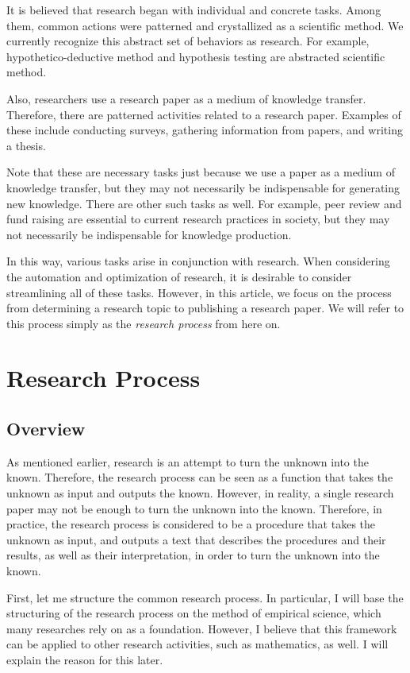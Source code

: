 \documentclass{book}
\begin{document}
It is believed that research began with individual and concrete tasks. Among them, common actions were patterned and crystallized as a scientific method. We currently recognize this abstract set of behaviors as research. For example, hypothetico-deductive method and hypothesis testing are abstracted scientific method.

Also, researchers use a research paper as a medium of knowledge transfer. Therefore, there are patterned activities related to a research paper. Examples of these include conducting surveys, gathering information from papers, and writing a thesis.

Note that these are necessary tasks just because we use a paper as a medium of knowledge transfer, but they may not necessarily be indispensable for generating new knowledge. There are other such tasks as well. For example, peer review and fund raising are essential to current research practices in society, but they may not necessarily be indispensable for knowledge production.

In this way, various tasks arise in conjunction with research. When considering the automation and optimization of research, it is desirable to consider streamlining all of these tasks. However, in this article, we focus on the process from determining a research topic to publishing a research paper. We will refer to this process simply as the \textit{research process} from here on.

\section{Research Process}

\subsection{Overview}

As mentioned earlier, research is an attempt to turn the unknown into the known. Therefore, the research process can be seen as a function that takes the unknown as input and outputs the known. However, in reality, a single research paper may not be enough to turn the unknown into the known. Therefore, in practice, the research process is considered to be a procedure that takes the unknown as input, and outputs a text that describes the procedures and their results, as well as their interpretation, in order to turn the unknown into the known.

First, let me structure the common research process. In particular, I will base the structuring of the research process on the method of empirical science, which many researches rely on as a foundation. However, I believe that this framework can be applied to other research activities, such as mathematics, as well. I will explain the reason for this later.
\end{document}
